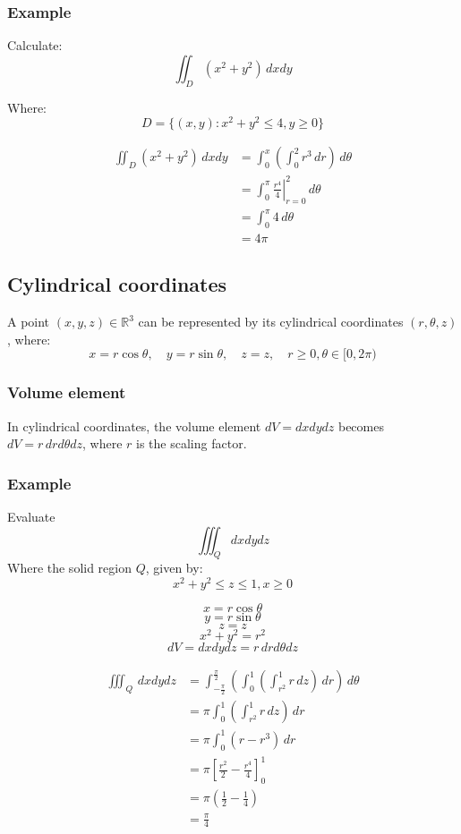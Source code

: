\documentclass[11pt]{article}
\begin{document}
\subsubsection{Example}
\label{sec:orgcd6b9f2}
Calculate:
\[\iint_D (x^2 + y^2) \, dx dy\]

Where:
\[D = \{(x, y) : x^2 + y^2 \le 4, y \ge 0\}\]

\begin{align*}
\iint_D (x^2 + y^2) \, dx dy &= \int_0^x \left( \int_0^2 r^3 \, dr \right) \, d \theta \\
&= \int_0^\pi \left. \frac{r^4}{4} \right|_{r = 0}^2 \, d \theta \\
&= \int_0^\pi 4 \, d \theta \\
&= 4 \pi
\end{align*}

\newpage
\subsection{Cylindrical coordinates}
\label{sec:org3b8ed45}
A point \((x, y, z) \in \mathbb{R}^3\) can be represented by its cylindrical coordinates \((r, \theta, z)\), where:
\[x = r \cos \theta, \quad y = r \sin \theta, \quad z = z, \quad r \ge 0, \theta \in [0, 2\pi)\]
\subsubsection{Volume element}
\label{sec:orgad17310}
In cylindrical coordinates, the volume element \(dV = dx dy dz\) becomes \(dV = r \, dr d\theta dz\), where \(r\) is the scaling factor.
\subsubsection{Example}
\label{sec:org5816e01}
Evaluate
\[\iiint_Q dx dy dz\]
Where the solid region \(Q\), given by:
\[x^2 + y^2 \le z \le 1, x \ge 0\]

\[x = r \cos \theta\]
\[y = r \sin \theta\]
\[z = z\]
\[x^2 + y^2 = r^2\]
\[dV = dx dy dz = r \, dr d \theta dz\]

\begin{align*}
\iiint_Q \, dx dy dz &= \int_{-\frac{\pi}{2}}^{\frac{\pi}{2}} \left( \int_0^1 \left( \int_{r^2}^1 r \, dz \right) \, dr \right) \, d \theta \\
&= \pi \int_0^1 \left(\int_{r^2}^1 r \, dz \right) \, dr \\
&= \pi \int_0^1 (r - r^3) \, dr \\
&= \pi \left[\frac{r^2}{2} - \frac{r^4}{4} \right]_0^1 \\
&= \pi \left(\frac{1}{2} - \frac{1}{4} \right) \\
&= \frac{\pi}{4}
\end{align*}
\end{document}
